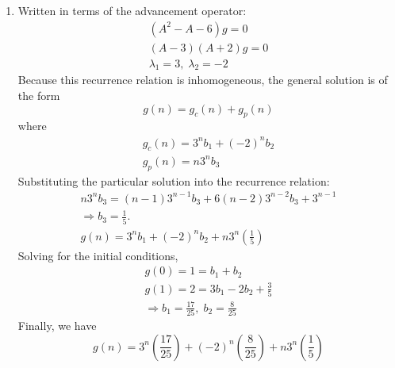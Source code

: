 \documentclass[a4paper,12pt]{article}
\begin{document}
\begin{enumerate}
	\item Written in terms of the advancement operator:
	\begin{gather*}
	(A^2 - A - 6)g = 0 \\
	(A - 3)(A + 2)g = 0 \\
	\lambda_1 = 3, \; \lambda_2 = -2
	\end{gather*}
	Because this recurrence relation is inhomogeneous, the general solution is of the form
	\[ g(n) = g_c(n) + g_p(n) \]
	where
	\begin{gather*}
	g_c(n) = 3^n b_1 + (-2)^n b_2 \\
	g_p(n) = n3^n b_3
	\end{gather*}
	Substituting the particular solution into the recurrence relation:
	\begin{gather*}
	n3^nb_3 = (n - 1)3^{n - 1}b_3 + 6(n - 2)3^{n - 2}b_3 + 3^{n - 1} \\
	\Rightarrow b_3 = \frac{1}{5}. \\
	g(n) = 3^n b_1 + (-2)^n b_2 + n3^n\left( \frac{1}{5} \right)
	\end{gather*}
	Solving for the initial conditions,
	\begin{gather*}
	g(0) = 1 = b_1 + b_2 \\
	g(1) = 2 = 3b_1 - 2b_2 + \frac{3}{5} \\
	\Rightarrow b_1 = \frac{17}{25}, \; b_2 = \frac{8}{25}
	\end{gather*}
	Finally, we have
	\[ g(n) = 3^n\left( \frac{17}{25} \right) + (-2)^n\left( \frac{8}{25} \right) + n3^n\left( \frac{1}{5} \right) \]
\end{enumerate}
\end{document}
